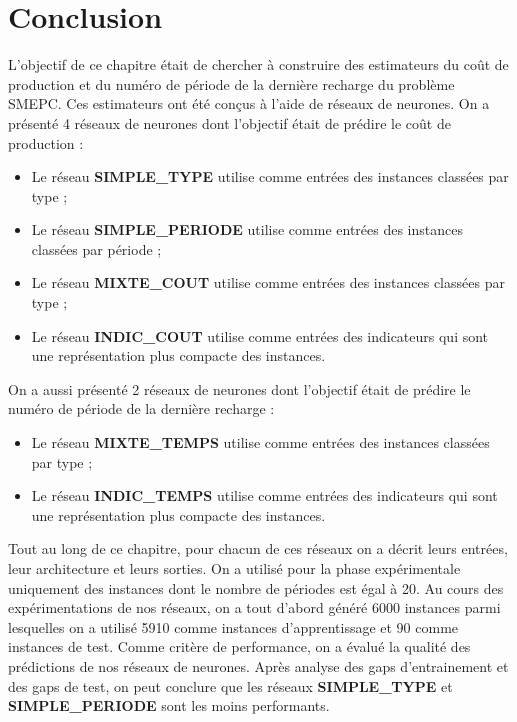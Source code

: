 


\section{Conclusion}

L'objectif de ce chapitre était de chercher à construire des estimateurs du coût de production et du numéro de période de la dernière recharge du problème SMEPC. Ces estimateurs ont été conçus à l'aide de réseaux de neurones. On a présenté 4 réseaux de neurones dont l'objectif était de prédire le coût de production :
\begin{itemize}[label=$\square$]
	\item Le réseau \textbf{SIMPLE\_TYPE} utilise comme entrées des instances classées par type ;
	\item Le réseau \textbf{SIMPLE\_PERIODE} utilise comme entrées des instances classées par période ;
	\item Le réseau \textbf{MIXTE\_COUT} utilise comme entrées des instances classées par type ;
	\item Le réseau \textbf{INDIC\_COUT} utilise comme entrées des indicateurs qui sont une représentation plus compacte des instances.
\end{itemize} 

On a aussi présenté 2 réseaux de neurones dont l'objectif était de prédire le numéro de période de la dernière recharge :
\begin{itemize}[label=$\square$]
	
	\item Le réseau \textbf{MIXTE\_TEMPS} utilise comme entrées des instances classées par type ;
	\item Le réseau \textbf{INDIC\_TEMPS} utilise comme entrées des indicateurs qui sont une représentation plus compacte des instances.
\end{itemize} 

Tout au long de ce chapitre, pour chacun de ces réseaux on a décrit leurs entrées, leur architecture et leurs sorties. On a utilisé pour la phase expérimentale uniquement des instances dont le nombre de périodes est égal à 20. 
Au cours des expérimentations de nos réseaux, on a tout d'abord généré 6000 instances parmi lesquelles on a utilisé 5910 comme instances d'apprentissage et 90 comme instances de test. Comme critère de performance, on a évalué la qualité des prédictions de nos réseaux de neurones. Après analyse des gaps d'entrainement et des gaps de test, on peut conclure que les réseaux \textbf{SIMPLE\_TYPE} et \textbf{SIMPLE\_PERIODE} sont les moins performants.

